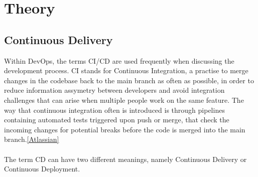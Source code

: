 \section{Theory}
  \subsection{Continuous Delivery}
    Within DevOps, the terms CI/CD are used frequently when discussing the development process. CI stands for Continuous Integration, a practise to merge changes in the codebase back to the main branch as often as possible, in order to reduce information assymetry between developers and avoid integration challenges that can arise when multiple people work on the same feature. The way that continuous integration often is introduced is through pipelines containing automated tests triggered upon push or merge, that check the incoming changes for potential breaks before the code is merged into the main branch.\ref{Atlassian}

  \paragraph{}
    The term CD can have two different meanings, namely Continuous Delivery or Continuous Deployment. 